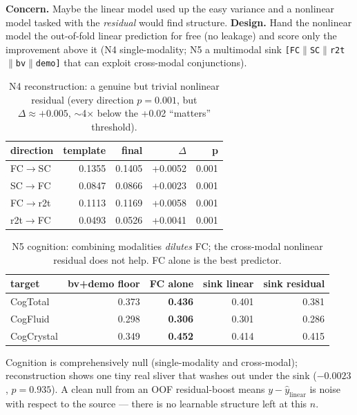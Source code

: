 \documentclass{article}
\newcommand{\fcsc}{FC$\rightarrow$SC}
\newcommand{\scfc}{SC$\rightarrow$FC}
\begin{document}
\textbf{Concern.} Maybe the linear model used up the easy variance and a nonlinear model
tasked with the \emph{residual} would find structure.
\textbf{Design.} Hand the nonlinear model the out-of-fold linear prediction for free (no
leakage) and score only the improvement above it (N4 single-modality; N5 a multimodal sink
\texttt{[FC$\|$SC$\|$r2t$\|$bv$\|$demo]} that can exploit cross-modal conjunctions).

\begin{table}[h]
\centering\small
\caption{N4 reconstruction: a genuine but trivial nonlinear residual (every direction
$p=0.001$, but $\Delta\approx+0.005$, $\sim$4$\times$ below the +0.02 ``matters'' threshold).}
\begin{tabular}{@{}lrrrr@{}}
\toprule
\textbf{direction} & \textbf{template} & \textbf{final} & \textbf{$\Delta$} & \textbf{p} \\
\midrule
\fcsc & 0.1355 & 0.1405 & +0.0052 & 0.001 \\
\scfc & 0.0847 & 0.0866 & +0.0023 & 0.001 \\
FC$\rightarrow$r2t & 0.1113 & 0.1169 & +0.0058 & 0.001 \\
r2t$\rightarrow$FC & 0.0493 & 0.0526 & +0.0041 & 0.001 \\
\bottomrule
\end{tabular}
\end{table}

\begin{table}[h]
\centering\small
\caption{N5 cognition: combining modalities \emph{dilutes} FC; the cross-modal nonlinear
residual does not help. FC alone is the best predictor.}
\begin{tabular}{@{}lrrrr@{}}
\toprule
\textbf{target} & \textbf{bv+demo floor} & \textbf{FC alone} & \textbf{sink linear} & \textbf{sink residual} \\
\midrule
CogTotal & 0.373 & \textbf{0.436} & 0.401 & 0.381 \\
CogFluid & 0.298 & \textbf{0.306} & 0.301 & 0.286 \\
CogCrystal & 0.349 & \textbf{0.452} & 0.414 & 0.415 \\
\bottomrule
\end{tabular}
\end{table}

Cognition is comprehensively null (single-modality and cross-modal); reconstruction shows one
tiny real sliver that washes out under the sink ($-0.0023$, $p=0.935$). A clean null from an
OOF residual-boost means $y-\hat{y}_{\text{linear}}$ is noise with respect to the source ---
there is no learnable structure left at this $n$.
\end{document}
